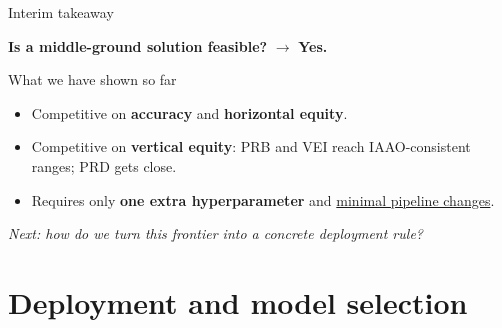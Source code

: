\documentclass[aspectratio=169,12pt,]{beamer}
\newcommand{\1}{\mathbf{1}}
\begin{document}
\begin{frame}{Interim takeaway}

\begin{center}
{\large\textbf{Is a middle-ground solution feasible?}\; $\rightarrow$\; \textbf{Yes.}}
\end{center}

\vspace{3mm}

\begin{block}{ What we have shown so far}
\begin{itemize}
\medskip
\item Competitive on \textbf{accuracy} and \textbf{horizontal equity}. \;
\medskip
\item Competitive on \textbf{vertical equity}: PRB and VEI reach IAAO-consistent ranges; PRD gets close. \;
\medskip
\item Requires only \textbf{one extra hyperparameter} and \underline{minimal pipeline changes}. \;
\medskip
\end{itemize}
\end{block}

\vspace{-2mm}
\begin{center}\itshape
Next: how do we turn this frontier into a concrete deployment rule?
\end{center}

\end{frame}


\section{Deployment and model selection}
\end{document}
